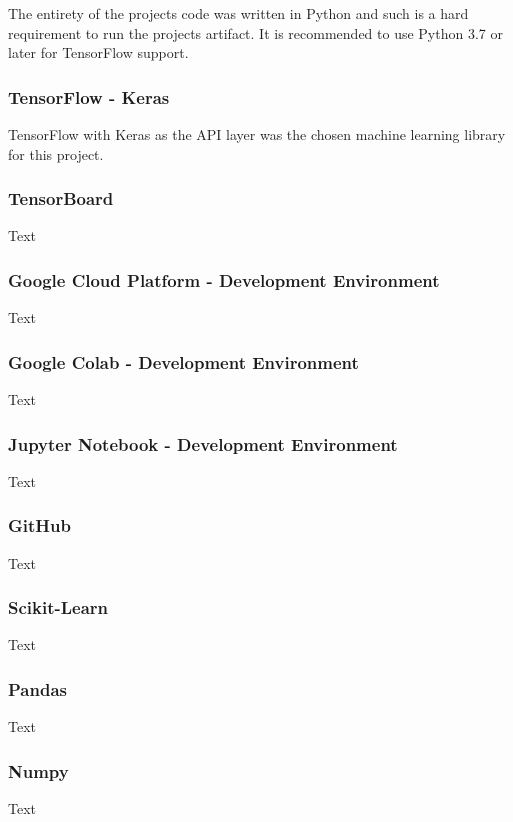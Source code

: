 The entirety of the projects code was written in Python and such is a hard requirement to run the projects artifact. It is recommended to use Python 3.7 or later for TensorFlow support.

\subsubsection{TensorFlow - Keras}
TensorFlow with Keras as the API layer was the chosen machine learning library for this project.

\subsubsection{TensorBoard}
Text

\subsubsection{Google Cloud Platform - Development Environment}
Text

\subsubsection{Google Colab - Development Environment}
Text

\subsubsection{Jupyter Notebook - Development Environment}
Text

\subsubsection{GitHub}
Text

\subsubsection{Scikit-Learn}
Text

\subsubsection{Pandas}
Text

\subsubsection{Numpy}
Text

